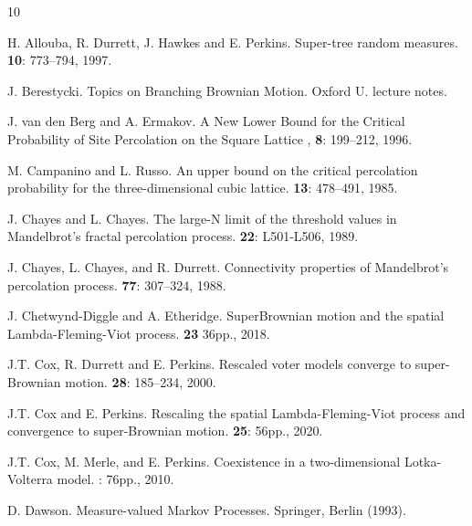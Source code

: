 \documentclass[12pt]{article}
\numberwithin{theorem}{section}
\theoremstyle{def}
\numberwithin{equation}{section}
\begin{document}

\def\cprime{$'$}
\begin{thebibliography}{10}

H. Allouba, R. Durrett, J. Hawkes and E. Perkins.
\newblock Super-tree random measures.
 {\bf 10}: 773--794, 1997.

J. Berestycki.
\newblock Topics on Branching Brownian Motion.
\newblock Oxford U. lecture notes.

J. van den Berg and A. Ermakov. 
\newblock A New Lower Bound for the Critical Probability of Site Percolation on the Square Lattice 
, {\bf 8}: 199--212, 1996.

M. Campanino and L. Russo.
\newblock An upper bound on the critical percolation probability for the three-dimensional
cubic lattice.
 {\bf 13}: 478--491, 1985.

J. Chayes and L. Chayes.
\newblock The large-N limit of the threshold values in Mandelbrot's fractal
percolation process.
 {\bf 22}: L501-L506, 1989.

J. Chayes, L. Chayes, and R. Durrett.
\newblock Connectivity properties of Mandelbrot's percolation process.
  {\bf 77}: 307--324, 1988.

J. Chetwynd-Diggle and A. Etheridge.
\newblock SuperBrownian motion and the spatial Lambda-Fleming-Viot process.
 {\bf 23} 36pp., 2018.

J.T. Cox, R. Durrett and E. Perkins.
\newblock Rescaled voter models converge to super-Brownian motion.
 {\bf 28}: 185--234, 2000.

J.T. Cox and E. Perkins.
Rescaling the spatial Lambda-Fleming-Viot process and convergence to super-Brownian motion.
 {\bf 25}: 56pp., 2020.

J.T. Cox, M. Merle, and E. Perkins.
Coexistence in a two-dimensional Lotka-Volterra model.
: 76pp., 2010.

D. Dawson.
\newblock Measure-valued Markov Processes.
\newblock Springer, Berlin (1993).


\end{thebibliography}
\end{document}
